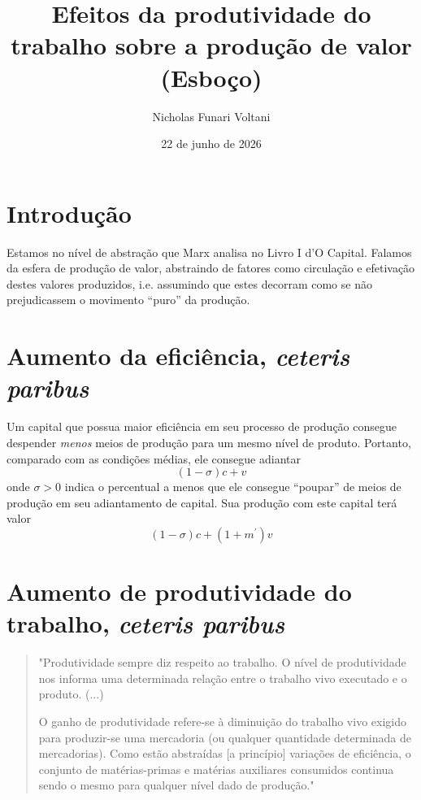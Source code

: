 \documentclass[12pt]{article}
\title{Efeitos da produtividade do trabalho sobre a produção de valor (\textbf{Esboço})}
\author{Nicholas Funari Voltani}
\date{22 de junho de 2026}
\numberwithin{equation}{section}
\theoremstyle{plain}
\theoremstyle{definition}
\theoremstyle{remark}
\begin{document}
\maketitle
\section{Introdução}
Estamos no nível de abstração que Marx analisa no Livro I d'O Capital. Falamos da esfera de produção de valor, abstraindo de fatores como circulação e efetivação destes valores produzidos, i.e. assumindo que estes decorram como se não prejudicassem o movimento ``puro'' da produção. 

\section{Aumento da eficiência, \textit{ceteris paribus}}
Um capital que possua maior eficiência em seu processo de produção consegue despender \textit{menos} meios de produção para um mesmo nível de produto. Portanto, comparado com as condições médias, ele consegue adiantar 
$$
(1-\sigma)c + v
$$
onde $\sigma>0$ indica o percentual a menos que ele consegue ``poupar'' de meios de produção em seu adiantamento de capital. Sua produção com este capital terá valor
$$
(1-\sigma)c + (1+m^{\prime})v
$$

\section{Aumento de produtividade do trabalho, \textit{ceteris paribus}}
\begin{quote}
"Produtividade sempre diz respeito ao trabalho. O nível de produtividade nos informa uma determinada relação entre o trabalho vivo executado e o produto. (...)

O ganho de produtividade refere-se à diminuição do trabalho vivo exigido para produzir-se uma mercadoria (ou qualquer quantidade determinada de mercadorias). Como estão abstraídas [a princípio] variações de eficiência, o conjunto de matérias-primas e matérias auxiliares consumidos continua sendo o mesmo para qualquer nível dado de produção." \parencite[p. 233]{SaBarreto2021a}
\end{quote}
\end{document}

